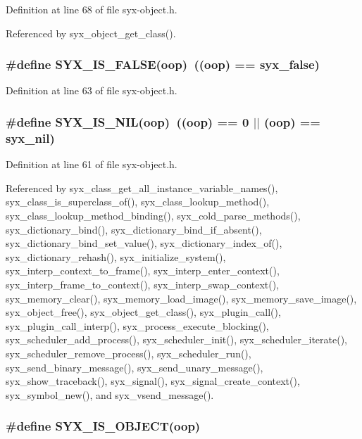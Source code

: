 Definition at line 68 of file syx-object.h.

Referenced by syx\_\-object\_\-get\_\-class().\hypertarget{syx-object_8h_bc047647f8b39be70f2e2a2e205a9923}{
\subsubsection{\setlength{\rightskip}{0pt plus 5cm}\#define SYX\_\-IS\_\-FALSE(oop)~((oop) == {\bf syx\_\-false})}}
\label{syx-object_8h_bc047647f8b39be70f2e2a2e205a9923}




Definition at line 63 of file syx-object.h.\hypertarget{syx-object_8h_a0618a2af4e0706b7080c6946ae43ee3}{
\subsubsection{\setlength{\rightskip}{0pt plus 5cm}\#define SYX\_\-IS\_\-NIL(oop)~((oop) == 0 $|$$|$ (oop) == {\bf syx\_\-nil})}}
\label{syx-object_8h_a0618a2af4e0706b7080c6946ae43ee3}




Definition at line 61 of file syx-object.h.

Referenced by syx\_\-class\_\-get\_\-all\_\-instance\_\-variable\_\-names(), syx\_\-class\_\-is\_\-superclass\_\-of(), syx\_\-class\_\-lookup\_\-method(), syx\_\-class\_\-lookup\_\-method\_\-binding(), syx\_\-cold\_\-parse\_\-methods(), syx\_\-dictionary\_\-bind(), syx\_\-dictionary\_\-bind\_\-if\_\-absent(), syx\_\-dictionary\_\-bind\_\-set\_\-value(), syx\_\-dictionary\_\-index\_\-of(), syx\_\-dictionary\_\-rehash(), syx\_\-initialize\_\-system(), syx\_\-interp\_\-context\_\-to\_\-frame(), syx\_\-interp\_\-enter\_\-context(), syx\_\-interp\_\-frame\_\-to\_\-context(), syx\_\-interp\_\-swap\_\-context(), syx\_\-memory\_\-clear(), syx\_\-memory\_\-load\_\-image(), syx\_\-memory\_\-save\_\-image(), syx\_\-object\_\-free(), syx\_\-object\_\-get\_\-class(), syx\_\-plugin\_\-call(), syx\_\-plugin\_\-call\_\-interp(), syx\_\-process\_\-execute\_\-blocking(), syx\_\-scheduler\_\-add\_\-process(), syx\_\-scheduler\_\-init(), syx\_\-scheduler\_\-iterate(), syx\_\-scheduler\_\-remove\_\-process(), syx\_\-scheduler\_\-run(), syx\_\-send\_\-binary\_\-message(), syx\_\-send\_\-unary\_\-message(), syx\_\-show\_\-traceback(), syx\_\-signal(), syx\_\-signal\_\-create\_\-context(), syx\_\-symbol\_\-new(), and syx\_\-vsend\_\-message().\hypertarget{syx-object_8h_0904e42bcfe1d2cb2522253294562c77}{
\subsubsection{\setlength{\rightskip}{0pt plus 5cm}\#define SYX\_\-IS\_\-OBJECT(oop)}}
\label{syx-object_8h_0904e42bcfe1d2cb2522253294562c77}


